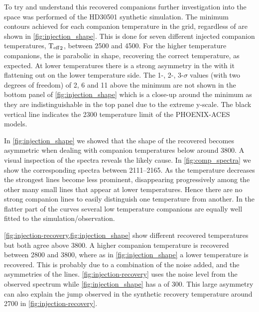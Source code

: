 To try and understand this recovered companions further investigation into the \textchisquared{} space was performed of the {HD30501} synthetic simulation.
The minimum \textchisquared{} contours achieved for each companion temperature in the grid, regardless of \Rvtwo{} are shown in \cref{fig:injection_shape}.
This is done for seven different injected companion temperatures, \({\textrm{T}_{\mathrm{eff}}}_{2}\), between 2500 and 4500\K{}.
For the higher temperature companions, the \textchisquared{} is parabolic in shape, recovering the correct temperature, as expected.
At lower temperatures there is a strong asymmetry in the \textchisquared{} with it flattening out on the lower temperature side.
The 1-, 2-, 3-\(\sigma\) values (with two degrees of freedom) of 2, 6 and 11 above the minimum \textchisquared{} are not shown in the bottom panel of \cref{fig:injection_shape} which is a close-up around the minimum \textchisquared{} as they are indistinguishable in the top panel due to the extreme \textchisquared{} y-scale.
The black vertical line indicates the 2300\K{} temperature limit of the {PHOENIX-ACES} models.

In \cref{fig:injection_shape} \textrm{we} showed that the shape of the recovered \textchisquared{} becomes asymmetric when dealing with companion temperatures below around 3800\K{}.
A visual inspection of the spectra reveals the likely cause.
In \cref{fig:comp_spectra} \textrm{we} show the corresponding spectra between 2111--2165\nm{}.
As the temperature decreases the strongest lines become less prominent, disappearing progressively among the other many small lines that appear at lower temperatures.
Hence there are no strong companion lines to easily distinguish one temperature from another.
In the flatter part of the \textchisquared{} curves several low temperature companions are equally well fitted to the simulation/observation.

\cref{fig:injection-recovery,fig:injection_shape} show different recovered temperatures but both agree above 3800\K{}.
A higher companion temperature is recovered between 2800 and 3800\K{}, where as in \cref{fig:injection_shape} a lower temperature is recovered.
This is probably due to a combination of the noise added, and the asymmetries of the \textchisquared{} lines.
\cref{fig:injection-recovery} uses the noise level from the observed spectrum while \cref{fig:injection_shape} has a \snr{} of 300.
This large asymmetry can also explain the jump observed in the synthetic recovery temperature around 2700\K{} in \cref{fig:injection-recovery}.

